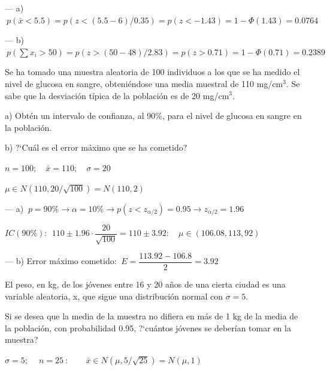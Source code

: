 \vspace{2mm} --- a) $	\ p(\bar x<5.5)=p(z<(5.5-6)/0.35)=p(z<-1.43)=1-\Phi(1.43)=0.0764$

\vspace{2mm} --- b) $ \ p(\sum x_i>50)=p(z>(50-48)/2.83)=p(z>0.71)=1-\Phi(0.71)=0.2389$

\vspace{4mm}
\begin{ejemplo}
\begin{ejer}
	Se ha tomado una muestra aleatoria de 100 individuos a los que se ha medido el nivel de glucosa en sangre, obteniéndose una media muestral de 110 mg/cm$^3$. Se sabe que la desviación típica de la población es de 20 mg/cm$^3$.

a) Obtén un intervalo de confianza, al 90\%, para el nivel de glucosa en sangre en la población.

b) ?`Cuál es el error máximo que se ha cometido?
\end{ejer}	
\end{ejemplo}

$n=100;\quad \bar x=110;\quad \sigma=20$

\vspace{2mm} $\mu \in N(110,20/\sqrt{100})=N(110,2)$

\vspace{2mm} --- a) $\ p=90\% \to \alpha=10\% \to p(z<z_{\alpha/2})=0.95 \to z_{\alpha/2}=1.96$

\vspace{2mm} $IC(90\%): \ \ 110 \pm 1.96\cdot \dfrac{20}{\sqrt{100}}=110\pm 3.92:\quad \mu \in (106.08,113,92)$

\vspace{2mm} --- b) Error máximo cometido: $\ E=\dfrac{113.92-106.8}{2}=3.92$


\vspace{4mm}
\begin{ejemplo}
\begin{ejer}
	
El peso, en kg, de los jóvenes entre 16 y 20 años de una cierta ciudad es una variable aleatoria, x, que sigue una distribución normal con $\sigma = 5$.

Si se desea que la media de la muestra no difiera en más de 1 kg de la media de la población, con probabilidad 0.95, ?`cuántos jóvenes se deberían tomar en la muestra?
\end{ejer}	
\end{ejemplo}

$\sigma=5;\ \quad n=25 \ : \qquad \bar x \in N(\mu,5/\sqrt{25})=N(\mu,1)$

